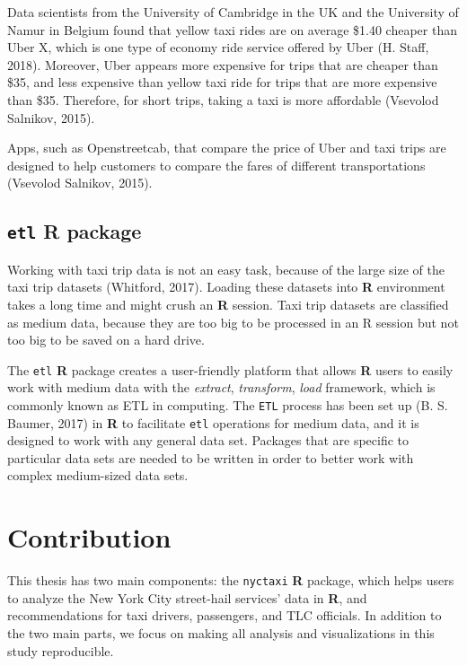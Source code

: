 \documentclass[12pt,twoside]{reedthesis}
\theoremstyle{definition}
\theoremstyle{definition}
\theoremstyle{definition}
\theoremstyle{remark}
\begin{document}
Data scientists from the University of Cambridge in the UK and the
University of Namur in Belgium found that yellow taxi rides are on
average \$1.40 cheaper than Uber X, which is one type of economy ride
service offered by Uber (H. Staff, 2018). Moreover, Uber appears more
expensive for trips that are cheaper than \$35, and less expensive than
yellow taxi ride for trips that are more expensive than \$35. Therefore,
for short trips, taking a taxi is more affordable (Vsevolod Salnikov,
2015).

Apps, such as Openstreetcab, that compare the price of Uber and taxi
trips are designed to help customers to compare the fares of different
transportations (Vsevolod Salnikov, 2015).

\subsection{\texorpdfstring{\texttt{etl} R
package}{etl R package}}\label{etl-r-package}

Working with taxi trip data is not an easy task, because of the large
size of the taxi trip datasets (Whitford, 2017). Loading these datasets
into \textbf{R} environment takes a long time and might crush an
\textbf{R} session. Taxi trip datasets are classified as medium data,
because they are too big to be processed in an R session but not too big
to be saved on a hard drive.

The \texttt{etl} \textbf{R} package creates a user-friendly platform
that allows \textbf{R} users to easily work with medium data with the
\emph{extract}, \emph{transform}, \emph{load} framework, which is
commonly known as ETL in computing. The \texttt{ETL} process has been
set up (B. S. Baumer, 2017) in \textbf{R} to facilitate \texttt{etl}
operations for medium data, and it is designed to work with any general
data set. Packages that are specific to particular data sets are needed
to be written in order to better work with complex medium-sized data
sets.

\section{Contribution}\label{contribution}

This thesis has two main components: the \texttt{nyctaxi} \textbf{R}
package, which helps users to analyze the New York City street-hail
services' data in \textbf{R}, and recommendations for taxi drivers,
passengers, and TLC officials. In addition to the two main parts, we
focus on making all analysis and visualizations in this study
reproducible.
\end{document}
